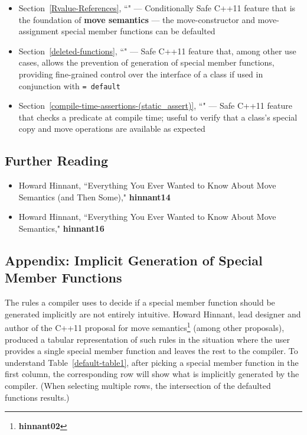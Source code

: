 {\begin{itemize}
\item{Section~\ref{Rvalue-References}, ``" — Conditionally Safe C++11 feature that is the foundation of \textbf{move semantics} — the move-constructor and move-assignment special member functions can be defaulted}
\item{Section~\ref{deleted-functions}, ``" — Safe C++11 feature that, among other use cases, allows the prevention of generation of special member functions, providing fine-grained control over the interface of a class if used in conjunction with \texttt{=}~\texttt{default}}
\item{Section~\ref{compile-time-assertions-(static_assert)}, ``" — Safe C++11 feature that checks a predicate at compile time; useful to verify that a class’s special copy and move operations are available as expected}
\end{itemize}

\subsection[Further Reading]{Further Reading}\label{further-reading}

\begin{itemize}
\item{Howard Hinnant, ``Everything You Ever Wanted to Know About Move Semantics (and Then Some)," \textbf{hinnant14}}
\item{Howard Hinnant, ``Everything You Ever Wanted to Know About Move Semantics," \textbf{hinnant16}}
\end{itemize}

\subsection[Appendix: Implicit Generation of Special Member Functions]{Appendix: Implicit Generation of Special Member Functions}\label{appendix:-implicit-generation-of-special-member-functions}

The rules a compiler uses to decide if a special member function
should be generated implicitly are not entirely intuitive. Howard
Hinnant, lead designer and author of the C++11 proposal for move
semantics\footnote{\textbf{hinnant02}} (among other proposals), produced a tabular representation of
such rules in the situation where the user provides a single special
member function and leaves the rest to the compiler. To understand Table~\ref{default-table1}, after picking a special member function in the first
column, the corresponding row will show what is implicitly generated by
the compiler. (When selecting multiple rows, the intersection of the
defaulted functions results.)



}
